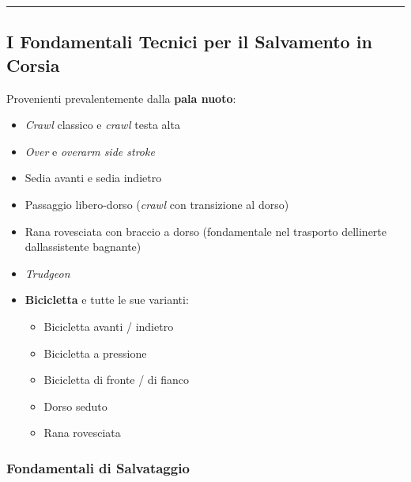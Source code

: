 \documentclass[a4paper,11pt]{article}
\providecommand{\tightlist}{%
  \setlength{\itemsep}{0pt}\setlength{\parskip}{0pt}}
\begin{document}
\begin{center}\rule{0.5\linewidth}{0.5pt}\end{center}

\subsection{I Fondamentali Tecnici per il Salvamento in
      Corsia}\label{i-fondamentali-tecnici-per-il-salvamento-in-corsia}

Provenienti prevalentemente dalla \textbf{pala nuoto}:

\begin{itemize}
      \tightlist
      \item
            \emph{Crawl} classico e \emph{crawl} testa alta
      \item
            \emph{Over} e \emph{overarm side stroke}
      \item
            Sedia avanti e sedia indietro
      \item
            Passaggio libero-dorso (\emph{crawl} con transizione al dorso)
      \item
            Rana rovesciata con braccio a dorso (fondamentale nel trasporto
            dell\textquotesingle inerte dall\textquotesingle assistente bagnante)
      \item
            \emph{Trudgeon}
      \item
            \textbf{Bicicletta} e tutte le sue varianti:

            \begin{itemize}
                  \tightlist
                  \item
                        Bicicletta avanti / indietro
                  \item
                        Bicicletta a pressione
                  \item
                        Bicicletta di fronte / di fianco
                  \item
                        Dorso seduto
                  \item
                        Rana rovesciata
            \end{itemize}
\end{itemize}

\subsubsection{Fondamentali di
      Salvataggio}\label{fondamentali-di-salvataggio}
\end{document}
